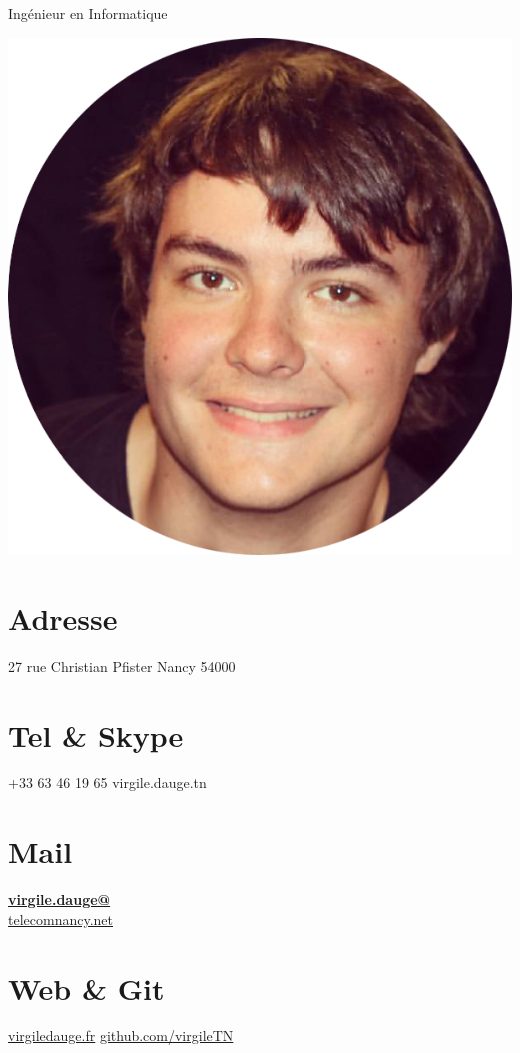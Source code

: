 \documentclass[]{friggeri-cv}
\begin{document}
      {Ingénieur en Informatique}
      
\begin{aside}
  \includegraphics[scale=0.2]{img/photoCV.png}
  \section{Adresse}
    27 rue Christian Pfister
    Nancy
    54000
    ~
  \section{Tel \& Skype}
    +33 63 46 19 65
    virgile.dauge.tn
    ~
  \section{Mail}
    \href{mailto:virgile.dauge@telecomnancy.net}{\textbf{virgile.dauge@}\\telecomnancy.net}
    ~
  \section{Web \& Git}
    \href{http://www.virgiledauge.fr}{virgiledauge.fr}
    \href{https://github.com/virgileTN}{github.com/virgileTN}
    ~

\end{aside}
\end{document}
